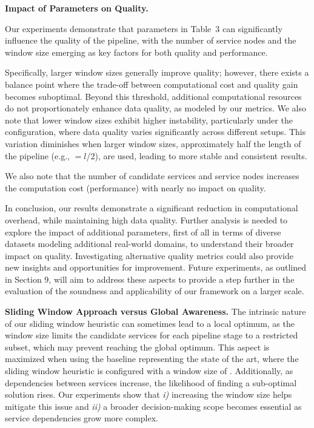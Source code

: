 \vspace{0.5em}

\noindent\textbf{Impact of Parameters on Quality.}
{\color{OurColor2}

Our experiments demonstrate that parameters in Table~3 can significantly influence the quality of the pipeline, with the number of service nodes and the window size emerging as key factors for both quality and performance.

Specifically, larger window sizes generally improve quality; however, there exists a balance point where the trade-off between computational cost and quality gain becomes suboptimal. Beyond this threshold, additional computational resources do not proportionately enhance data quality, as modeled by our metrics.
  We also note that lower window sizes exhibit higher instability, particularly under the \wide configuration, where data quality varies significantly across different setups. This variation diminishes when larger window sizes, approximately half the length of the pipeline (e.g., \windowsize$=$$l$/2), are used, leading to more stable and consistent results.

We also note that the number of candidate services and service nodes increases the computation cost (performance) with nearly no impact on quality.

  In conclusion, our results demonstrate a significant reduction in computational overhead, while
  maintaining high data quality. Further analysis is needed to explore the impact of additional parameters, first of all in terms of diverse datasets modeling additional real-world domains, to understand their broader impact on quality. Investigating alternative quality metrics could also provide new insights and opportunities for improvement. Future experiments, as outlined in Section 9, will aim to address these aspects to provide a step further in the evaluation of the soundness and applicability of our framework on a larger scale.
}
\vspace{0.5em}

\noindent\textbf{Sliding Window Approach versus Global Awareness.} The intrinsic nature of our sliding window heuristic can sometimes lead to a local optimum, as the window size limits the candidate services for each pipeline stage to a restricted subset, which may prevent reaching the global optimum. This aspect is maximized when using the baseline representing the state of the art, where the sliding window heuristic is configured with a window size of . Additionally, as dependencies between services increase, the likelihood of finding a sub-optimal solution rises. Our experiments show that \emph{i)} increasing the window size helps mitigate this issue and \emph{ii)} a broader decision-making scope becomes essential as service dependencies grow more complex.

